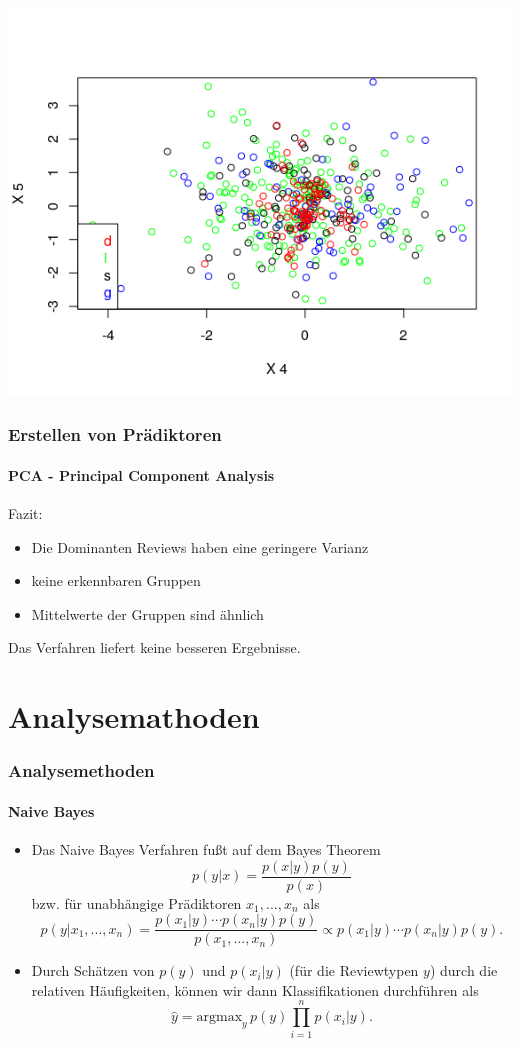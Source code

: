 \documentclass{beamer}
\begin{document}
\begin{frame}
 \includegraphics[scale=0.36]{PCA_4_5.png}
 
\end{frame}

\begin{frame}
 \frametitle{Erstellen von Prädiktoren}
 \framesubtitle{PCA - Principal Component Analysis}
 Fazit:
 \begin{itemize}
  \item Die Dominanten Reviews haben eine geringere Varianz
  \item keine erkennbaren Gruppen
  \item Mittelwerte der Gruppen sind ähnlich
 \end{itemize}
 
 Das Verfahren liefert keine besseren Ergebnisse. 

\end{frame}



\section{Analysemathoden}

\begin{frame}
\frametitle{Analysemethoden}
\framesubtitle{Naive Bayes}
\begin{itemize}\itemsep12pt
\item Das Naive Bayes Verfahren fußt auf dem Bayes Theorem
\[p(y|x) = \frac{p(x|y)p(y)}{p(x)}\]
bzw. für unabhängige Prädiktoren $x_1,...,x_n$ als
\[p(y|x_1,...,x_n)=\frac{p(x_1|y)\cdots p(x_n|y)p(y)}{p(x_1,...,x_n)}\propto p(x_1|y)\cdots p(x_n|y)p(y).\]
\item Durch Schätzen von $p(y)$ und $p(x_i|y)$ (für die Reviewtypen $y$) durch die relativen Häufigkeiten, können wir dann Klassifikationen durchführen als
\[\hat{y}=\text{argmax}_y\,p(y)\prod_{i=1}^np(x_i|y).\]
\end{itemize}
\end{frame}
\end{document}
